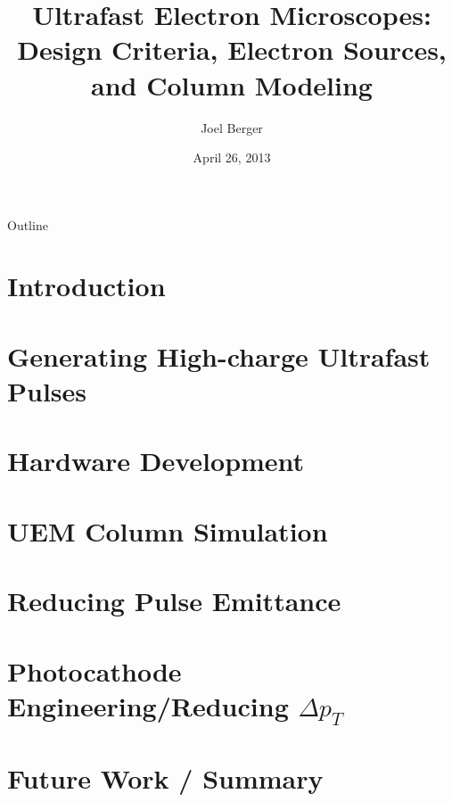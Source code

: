 \documentclass[mathserif]{beamer}
\title[Ultrafast EM]{Ultrafast Electron Microscopes:\\Design Criteria, Electron Sources, and Column Modeling}
\author{Joel Berger}
\institute[UIC]{Ph.D. Preliminary Examination}
\date{April 26, 2013}
\providecommand{\smallT}[0]{ { \scriptscriptstyle T } }
\begin{document}
\begin{frame}
  \maketitle
\end{frame}

\begin{frame}{Outline}
  \tableofcontents
\end{frame}



\section{Introduction}




\section{Generating High-charge Ultrafast Pulses}


\section{Hardware Development}


\section{UEM Column Simulation}


\section{Reducing Pulse Emittance}


\section{Photocathode Engineering/Reducing $\Delta p_{\smallT}$}


\section{Future Work / Summary}


\appendix

\end{document}

